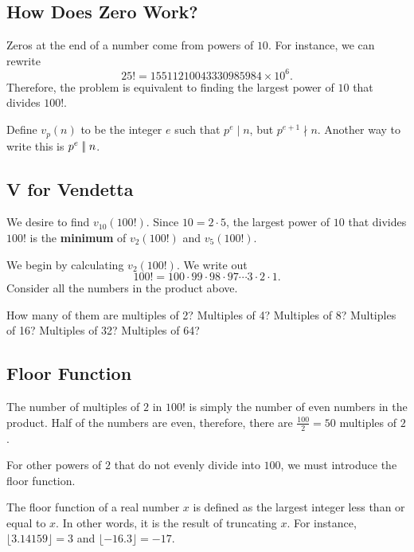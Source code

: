 \clearpage 

\subsection*{How Does Zero Work?}

Zeros at the end of a number come from powers of $10$.  For instance, we can rewrite $$25!=15511210043330985984\times 10^6.$$  
Therefore, the problem is equivalent to finding the largest power of $10$ that divides $100!$.  \begin{defi}  Define $v_p(n)$ to be the integer $e$ such that $p^e\mid n$, but $p^{e+1}\nmid n$. Another way to write this is $p^e\mid\!\mid n$. \end{defi} 

\clearpage



\subsection*{V for Vendetta}

We desire to find $v_{10}(100!)$.  Since $10=2\cdot 5$, the largest power of $10$ that divides $100!$ is the \textbf{minimum} of $v_2(100!)$ and $v_5(100!)$.   

We begin by calculating $v_2(100!)$. We write out $$100!=100\cdot 99\cdot 98\cdot 97\cdots 3\cdot 2\cdot 1.$$  Consider all the numbers in the product above. 

How many of them are multiples of 2?  Multiples of 4?  Multiples of 8?  Multiples of 16?  Multiples of 32?  Multiples of 64?  

\clearpage 

\subsection*{Floor Function}

The number of multiples of $2$ in $100!$ is simply the number of even numbers in the product. Half of the numbers are even, therefore, there are $\frac{100}{2}=50$ multiples of $2$.  

For other powers of $2$ that do not evenly divide into $100$, we must introduce the floor function.  

\begin{defi} The floor function of a real number $x$ is defined as the largest integer less than or equal to $x$. In other words, it is the result of truncating $x$. For instance, $\lfloor 3.14159 \rfloor=3$ and $\lfloor -16.3 \rfloor=-17$. \end{defi}

